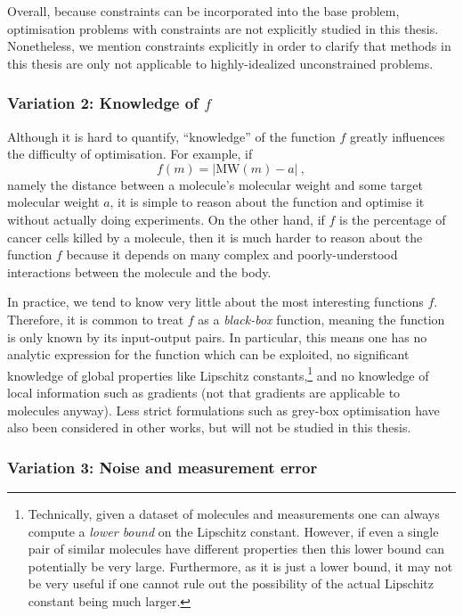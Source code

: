 Overall, because constraints can be incorporated into the base problem,
optimisation problems with constraints are not explicitly studied in this thesis.
Nonetheless, we mention constraints explicitly in order to clarify
that methods in this thesis are only not applicable to highly-idealized unconstrained problems.

\subsubsection{Variation 2: Knowledge of $f$}

Although it is hard to quantify, ``knowledge'' of the function $f$
greatly influences the difficulty of optimisation.
For example, if 
\begin{equation*}
    f(m) = \left| \mathrm{MW}(m) - a \right|\ ,
\end{equation*}
namely the distance between a molecule's
molecular weight and some target molecular weight $a$,
it is simple to reason about the function and optimise it
without actually doing experiments.
On the other hand, if $f$ is the percentage of cancer cells killed by a molecule,
then it is much harder to reason about the function $f$ because
it depends on many complex and poorly-understood interactions between
the molecule and the body.

In practice, we tend to know very little about the most interesting functions $f$.
Therefore, it is common to treat $f$ as a \emph{black-box} function,
meaning the function is only known by its input-output pairs.
In particular, this means one has no analytic expression for the function which can be exploited,
no significant knowledge of global properties like Lipschitz constants,\footnote{
    Technically, given a dataset of molecules and measurements
    one can always compute a \emph{lower bound} on the Lipschitz constant.
    However, if even a single pair of similar molecules have different properties
    then this lower bound can potentially be very large.
    Furthermore, as it is just a lower bound,
    it may not be very useful if one cannot rule out the possibility
    of the actual Lipschitz constant being much larger.
}
and no knowledge of local information such as gradients (not that gradients are applicable to molecules anyway).
Less strict formulations such as grey-box optimisation have also been considered in other works,
but will not be studied in this thesis.

\subsubsection{Variation 3: Noise and measurement error}

